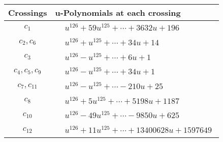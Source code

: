 \documentclass[1p]{elsarticle_modified}
\theoremstyle{definition}
\begin{document}
\begin{tabular}{m{50pt}|m{274pt}}
Crossings & \hspace{64pt}u-Polynomials at each crossing \\
\hline $$\begin{aligned}c_{1}\end{aligned}$$&$\begin{aligned}
&u^{126}+59 u^{125}+\cdots+3632 u+196
\end{aligned}$\\
\hline $$\begin{aligned}c_{2},c_{6}\end{aligned}$$&$\begin{aligned}
&u^{126}+u^{125}+\cdots+34 u+14
\end{aligned}$\\
\hline $$\begin{aligned}c_{3}\end{aligned}$$&$\begin{aligned}
&u^{126}- u^{125}+\cdots+6 u+1
\end{aligned}$\\
\hline $$\begin{aligned}c_{4},c_{5},c_{9}\end{aligned}$$&$\begin{aligned}
&u^{126}- u^{125}+\cdots+34 u+1
\end{aligned}$\\
\hline $$\begin{aligned}c_{7},c_{11}\end{aligned}$$&$\begin{aligned}
&u^{126}- u^{125}+\cdots-210 u+25
\end{aligned}$\\
\hline $$\begin{aligned}c_{8}\end{aligned}$$&$\begin{aligned}
&u^{126}+5 u^{125}+\cdots+5198 u+1187
\end{aligned}$\\
\hline $$\begin{aligned}c_{10}\end{aligned}$$&$\begin{aligned}
&u^{126}-49 u^{125}+\cdots-9850 u+625
\end{aligned}$\\
\hline $$\begin{aligned}c_{12}\end{aligned}$$&$\begin{aligned}
&u^{126}+11 u^{125}+\cdots+13400628 u+1597649
\end{aligned}$\\
\hline
\end{tabular}\\~\\
\end{document}
